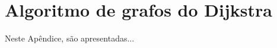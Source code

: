 
\chapter{Algoritmo de grafos do Dijkstra}
\label{apd:1:complementacao}

Neste Apêndice, são apresentadas...


